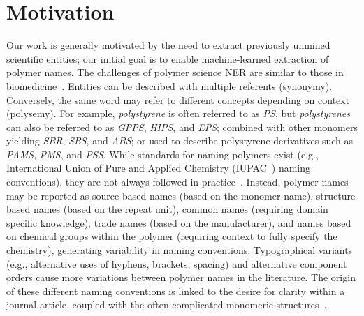 \section{Motivation}
\label{sect:background}
Our work is generally motivated by the need to extract previously unmined scientific entities;
our initial goal is to enable machine-learned extraction of polymer names. 
The challenges of polymer science NER are similar to those in biomedicine~\cite{krallinger2015chemdner,kim2004introduction}. 
Entities can be described with multiple referents (synonymy).
Conversely, the same word may refer to different concepts depending on context (polysemy).
For example,
\textit{polystyrene} is often referred to as \textit{PS}, but \textit{polystyrenes} can also be referred to as \textit{GPPS}, \textit{HIPS}, and \textit{EPS}; combined with other monomers yielding \textit{SBR}, \textit{SBS}, and \textit{ABS}; or used to describe polystyrene derivatives such as \textit{PAMS}, \textit{PMS}, and \textit{PSS}.
While standards for naming polymers exist (e.g., International Union of Pure and Applied Chemistry (IUPAC~\cite{hiorns2013brief}) naming conventions), they are not always followed in practice~\cite{tamames2006success}. 
Instead, polymer names may be reported as source-based names (based on the monomer name), structure-based names (based on the repeat unit), common names (requiring domain specific knowledge), trade names (based on the manufacturer), and names based on chemical groups within the polymer (requiring context to fully specify the chemistry), generating variability in naming conventions.
Typographical variants (e.g., alternative uses of hyphens, brackets, spacing) and alternative component orders cause more variations between polymer names in the literature.
The origin of these different naming conventions is linked to the desire for clarity within a journal article, coupled with the often-complicated monomeric structures~\cite{audus2017polymer}.
